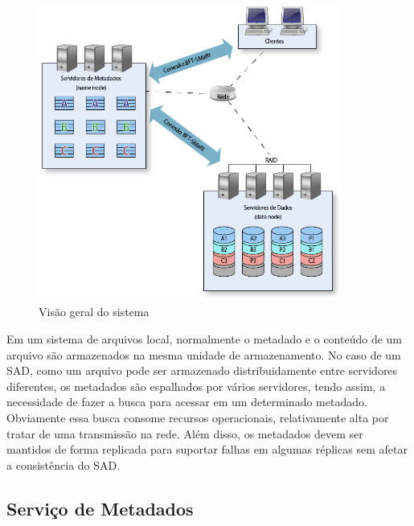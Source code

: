 \begin{figure}[htb]
	\begin{center}
		
		\includegraphics[clip,width=10.0cm]{images/visao_geral.png}
		\caption{Visão geral do sistema}
		\label{fig:vis_sis}
	\end{center}
\end{figure}

Em um sistema de arquivos local, normalmente o metadado e o conteúdo de um arquivo são armazenados na mesma unidade de armazenamento. No caso de um SAD, como um arquivo pode ser armazenado distribuidamente entre servidores diferentes, os metadados são espalhados por vários servidores, tendo assim, a necessidade de fazer a busca para acessar em um determinado metadado. Obviamente essa busca consome recursos operacionais, relativamente alta por tratar de uma transmissão na rede.
Além disso, os metadados devem ser mantidos de forma replicada para suportar falhas em algumas réplicas sem afetar a consistência do SAD.
   \\

		

\subsection{Serviço de Metadados}

